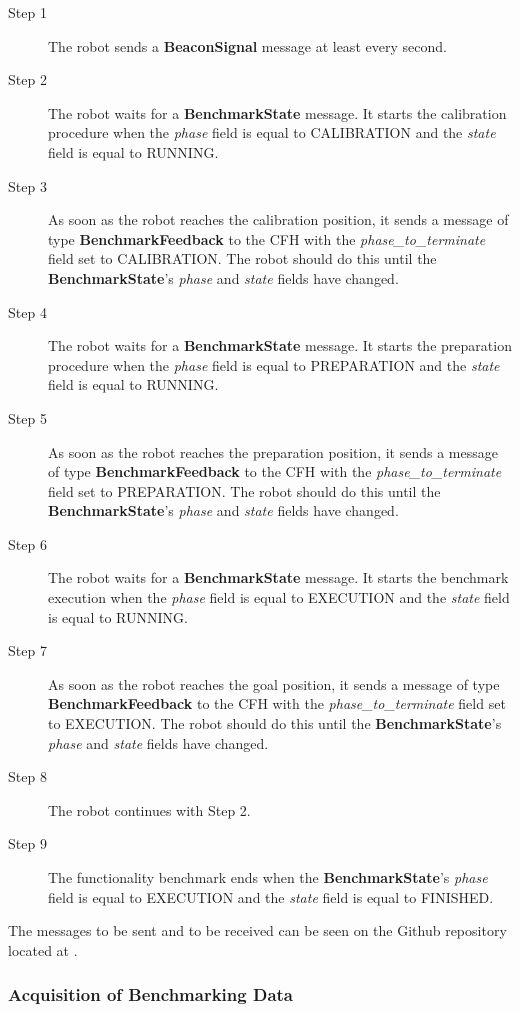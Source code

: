 \begin{description}
\item[Step 1] The robot sends a \textbf{BeaconSignal} message at least every second.
\item[Step 2] The robot waits for a \textbf{BenchmarkState} message. It starts the calibration procedure when the \emph{phase} field is equal to CALIBRATION and the \emph{state} field is equal to RUNNING.
\item[Step 3] As soon as the robot reaches the calibration position, it sends a message of type \textbf{BenchmarkFeedback} to the CFH with the \emph{phase\_to\_terminate} field set to CALIBRATION. The robot should do this until the \textbf{BenchmarkState}'s \emph{phase} and \emph{state} fields have changed.
\item[Step 4] The robot waits for a \textbf{BenchmarkState} message. It starts the preparation procedure when the \emph{phase} field is equal to PREPARATION and the \emph{state} field is equal to RUNNING.
\item[Step 5] As soon as the robot reaches the preparation position, it sends a message of type \textbf{BenchmarkFeedback} to the CFH with the \emph{phase\_to\_terminate} field set to PREPARATION. The robot should do this until the \textbf{BenchmarkState}'s \emph{phase} and \emph{state} fields have changed.
\item[Step 6] The robot waits for a \textbf{BenchmarkState} message. It starts the benchmark execution when the \emph{phase} field is equal to EXECUTION and the \emph{state} field is equal to RUNNING.
\item[Step 7] As soon as the robot reaches the goal position, it sends a message of type \textbf{BenchmarkFeedback} to the CFH with the \emph{phase\_to\_terminate} field set to EXECUTION. The robot should do this until the \textbf{BenchmarkState}'s \emph{phase} and \emph{state} fields have changed.
\item[Step 8] The robot continues with Step 2.
\item[Step 9] The functionality benchmark ends when the \textbf{BenchmarkState}'s \emph{phase} field is equal to EXECUTION  and the \emph{state} field is equal to FINISHED.
\end{description}
\noindent
The messages to be sent and to be received can be seen on the Github repository located at \cite{rockin:CFHMessages}.

\subsubsection{Acquisition of Benchmarking Data}
\label{sssec:ControlData}

